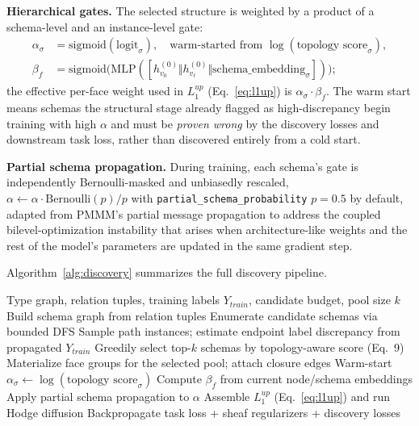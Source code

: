 \documentclass{article}
\begin{document}
\textbf{Hierarchical gates.} The selected structure is weighted by a product of a schema-level and
an instance-level gate:
\begin{align}
  \alpha_\sigma &= \mathrm{sigmoid}(\mathrm{logit}_\sigma), \quad \text{warm-started from } \log(\text{topology score}_\sigma), \\
  \beta_f &= \mathrm{sigmoid}\big(\mathrm{MLP}([h^{(0)}_{v_0} \Vert h^{(0)}_{v_\ell} \Vert \text{schema\_embedding}_\sigma])\big);
\end{align}
the effective per-face weight used in $L_1^{up}$ (Eq.~\ref{eq:l1up}) is $\alpha_\sigma \cdot
\beta_f$. The warm start means schemas the structural stage already flagged as high-discrepancy
begin training with high $\alpha$ and must be \emph{proven wrong} by the discovery losses and
downstream task loss, rather than discovered entirely from a cold start.

\textbf{Partial schema propagation.} During training, each schema's gate is independently
Bernoulli-masked and unbiasedly rescaled, $\alpha \leftarrow \alpha \cdot \mathrm{Bernoulli}(p)/p$
with \texttt{partial\_schema\_probability} $p=0.5$ by default, adapted from PMMM's partial message
propagation to address the coupled bilevel-optimization instability that arises when
architecture-like weights and the rest of the model's parameters are updated in the same gradient
step.

Algorithm~\ref{alg:discovery} summarizes the full discovery pipeline.

\begin{algorithm}[t]
  \caption{Schema-to-cell discovery (training-time forward pass)}
  \label{alg:discovery}
  \begin{algorithmic}[1]
    \Require Type graph, relation tuples, training labels $Y_{train}$, candidate budget, pool size $k$
    \State Build schema graph from relation tuples 
    \State Enumerate candidate schemas via bounded DFS 
      \State Sample path instances; estimate endpoint label discrepancy from propagated $Y_{train}$ 
    \EndFor
    \State Greedily select top-$k$ schemas by topology-aware score (Eq.~9) 
    \State Materialize face groups for the selected pool; attach closure edges 
    \State Warm-start $\alpha_\sigma \gets \log(\text{topology score}_\sigma)$
      \State Compute $\beta_f$ from current node/schema embeddings
      \State Apply partial schema propagation to $\alpha$
      \State Assemble $L_1^{up}$ (Eq.~\ref{eq:l1up}) and run Hodge diffusion
      \State Backpropagate task loss + sheaf regularizers + discovery losses
    \EndWhile
  \end{algorithmic}
\end{algorithm}
\end{document}
